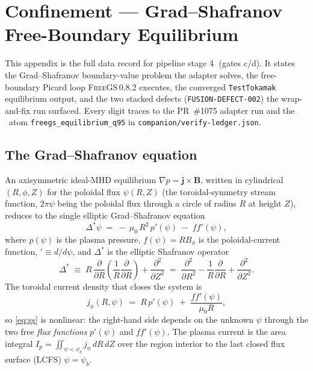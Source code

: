 \section{Confinement --- Grad--Shafranov Free-Boundary Equilibrium}
\label{app:confinement}

This appendix is the full data record for pipeline stage
\textcircled{\scriptsize 4} (gates c/d). It states the Grad--Shafranov
boundary-value problem the adapter solves, the free-boundary Picard
loop \textsc{FreeGS}\,0.8.2 \citep{freegs} executes, the converged
\texttt{TestTokamak} equilibrium output, and the two stacked defects
(\texttt{FUSION-DEFECT-002}) the wrap-and-fix run surfaced. Every digit
traces to the PR~\#1075 adapter run and the \tierGreen\ atom
\texttt{freegs\_equilibrium\_q95} in
\texttt{companion/verify-ledger.json}.

\subsection{The Grad--Shafranov equation}
\label{app:gs-pde}

An axisymmetric ideal-MHD equilibrium $\nabla p = \mathbf{j}\times\mathbf{B}$,
written in cylindrical $(R,\phi,Z)$ for the poloidal flux
$\psi(R,Z)$ (the toroidal-symmetry stream function,
$2\pi\psi$ being the poloidal flux through a circle of radius $R$ at
height $Z$), reduces to the single elliptic Grad--Shafranov equation
\citep{grad1958ms,shafranov1966}
\begin{equation}
\Delta^{*}\psi
  \;=\;
  -\,\mu_0\,R^{2}\,p'(\psi)\;-\;ff'(\psi),
\label{eq:gs}
\end{equation}
where $p(\psi)$ is the plasma pressure, $f(\psi)=R B_\phi$ is the
poloidal-current function, $'\equiv d/d\psi$, and $\Delta^{*}$ is the
elliptic Shafranov operator
\begin{equation}
\Delta^{*}
  \;\equiv\;
  R\,\frac{\partial}{\partial R}\!\left(\frac{1}{R}\frac{\partial}{\partial R}\right)
  + \frac{\partial^{2}}{\partial Z^{2}}
  \;=\;
  \frac{\partial^{2}}{\partial R^{2}}
  - \frac{1}{R}\frac{\partial}{\partial R}
  + \frac{\partial^{2}}{\partial Z^{2}} .
\label{eq:starlap}
\end{equation}
The toroidal current density that closes the system is
\begin{equation}
j_\phi(R,\psi)
  \;=\;
  R\,p'(\psi)\;+\;\frac{ff'(\psi)}{\mu_0 R},
\label{eq:jphi}
\end{equation}
so \eqref{eq:gs} is nonlinear: the right-hand side depends on the
unknown $\psi$ through the two free \emph{flux functions} $p'(\psi)$ and
$ff'(\psi)$. The plasma current is the area integral
$I_p=\iint_{\psi<\psi_b}\!j_\phi\,dR\,dZ$ over the region interior to the
last closed flux surface (LCFS) $\psi=\psi_b$.

